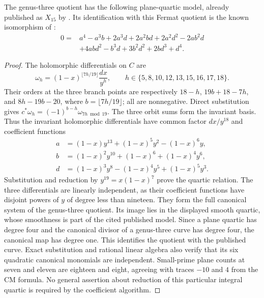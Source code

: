 \begin{lemma}\label{lem:nineteen-canonical}
The genus-three quotient has the following plane-quartic
model, already published as $X_{15}$ by
\citet[author pp.~2 and 22; Table~1, case~15, p.~5]{KilicerEtAl2018}.
Its identification with this Fermat quotient is the known isomorphism of
\citet[Remark~7.2, p.~12]{Tafazolian2026}:
\[
\begin{split}
0={}&a^4-a^3b+2a^3d+2a^2bd+2a^2d^2-2ab^2d\\
 &+4abd^2-b^3d+3b^2d^2+2bd^3+d^4.
\end{split}
\]
\end{lemma}
\begin{proof}
The holomorphic differentials on $C$ are
\[
 \omega_h=(1-x)^{\lfloor7h/19\rfloor}\frac{dx}{y^h},\qquad
 h\in\{5,8,10,12,13,15,16,17,18\}.
\]
Their orders at the three branch points are respectively
$18-h$, $19b+18-7h$, and $8h-19b-20$, where $b=\lfloor7h/19\rfloor$;
all are nonnegative. Direct substitution gives
$c^*\omega_h=(-1)^{b-h}\omega_{7h\bmod19}$.
The three orbit sums form the invariant basis. Thus the invariant
holomorphic differentials have common
factor $dx/y^{18}$ and coefficient functions
\[
\begin{split}
 a&=(1-x)y^{13}+(1-x)^5y^2-(1-x)^6y,\\
 b&=(1-x)^2y^{10}+(1-x)^6+(1-x)^4y^6,\\
 d&=(1-x)^3y^8-(1-x)^4y^5+(1-x)^5y^3.
\end{split}
\]
Substitution and reduction by $y^{19}=x(1-x)^7$ prove
the quartic relation.  The three differentials are linearly independent, as their coefficient
functions have disjoint powers of $y$ of degree less than nineteen.
They form the full canonical system of the genus-three quotient.
Its image lies in the displayed smooth quartic, whose smoothness
is part of the cited published model. Since a plane quartic has degree
four and the canonical divisor of a genus-three curve has degree
four, the canonical map has degree one. This identifies the quotient
with the published curve. Exact substitution and rational linear
algebra also verify that its six quadratic canonical monomials are
independent. Small-prime plane counts at seven and eleven are eighteen
and eight, agreeing with traces $-10$ and $4$ from the CM formula.
No general assertion about reduction of this particular integral
quartic is required by the coefficient algorithm.
\end{proof}
